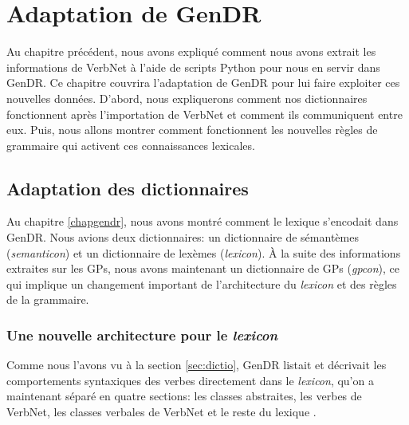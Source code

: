 
\chapter{Adaptation de GenDR}\label{ch:implementation}

Au chapitre précédent, nous avons expliqué comment nous avons extrait les informations de VerbNet à l'aide de scripts Python pour nous en servir dans GenDR. Ce chapitre couvrira l'adaptation de GenDR pour lui faire exploiter ces nouvelles données. D'abord, nous expliquerons comment nos dictionnaires fonctionnent après l'importation de VerbNet et comment ils communiquent entre eux. Puis, nous allons montrer comment fonctionnent les nouvelles règles de grammaire qui activent ces connaissances lexicales.

\section{Adaptation des dictionnaires}

Au chapitre \ref{chapgendr}, nous avons montré comment le lexique s'encodait dans GenDR. Nous avions deux dictionnaires: un dictionnaire de sémantèmes (\emph{semanticon}) et un dictionnaire de lexèmes (\emph{lexicon}). À la suite des informations extraites sur les \acp{GP}, nous avons maintenant un dictionnaire de \acp{GP} (\emph{gpcon}), ce qui implique un changement important de l'architecture du \emph{lexicon} et des règles de la grammaire.

\subsection{Une nouvelle architecture pour le \emph{lexicon}}

Comme nous l'avons vu à la section \ref{sec:dictio}, GenDR listait et décrivait les comportements syntaxiques des verbes directement dans le \emph{lexicon}, qu'on a maintenant séparé en quatre sections: les classes abstraites, les verbes de VerbNet, les classes verbales de VerbNet et le reste du lexique .

